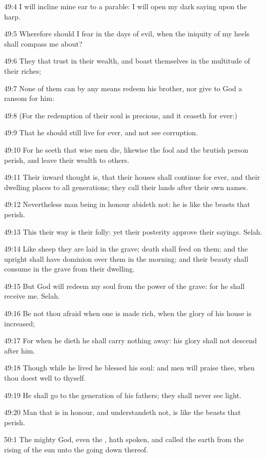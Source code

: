 49:4 I will incline mine ear to a parable: I will open my dark saying
upon the harp.

49:5 Wherefore should I fear in the days of evil, when the iniquity of
my heels shall compass me about?

49:6 They that trust in their wealth, and boast themselves in the
multitude of their riches;

49:7 None of them can by any means redeem his brother, nor give to God
a ransom for him:

49:8 (For the redemption of their soul is precious, and it ceaseth for
ever:)

49:9 That he should still live for ever, and not see corruption.

49:10 For he seeth that wise men die, likewise the fool and the
brutish person perish, and leave their wealth to others.

49:11 Their inward thought is, that their houses shall continue for
ever, and their dwelling places to all generations; they call their
lands after their own names.

49:12 Nevertheless man being in honour abideth not: he is like the
beasts that perish.

49:13 This their way is their folly: yet their posterity approve their
sayings. Selah.

49:14 Like sheep they are laid in the grave; death shall feed on them;
and the upright shall have dominion over them in the morning; and
their beauty shall consume in the grave from their dwelling.

49:15 But God will redeem my soul from the power of the grave: for he
shall receive me. Selah.

49:16 Be not thou afraid when one is made rich, when the glory of his
house is increased;

49:17 For when he dieth he shall carry nothing away: his glory shall
not descend after him.

49:18 Though while he lived he blessed his soul: and men will praise
thee, when thou doest well to thyself.

49:19 He shall go to the generation of his fathers; they shall never
see light.

49:20 Man that is in honour, and understandeth not, is like the beasts
that perish.



50:1 The mighty God, even the \LORD, hath spoken, and called the earth
from the rising of the sun unto the going down thereof.

